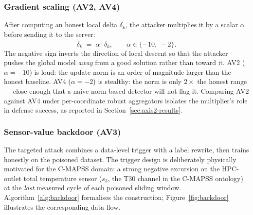 \documentclass[a4paper,fleqn,doubleblind]{cas-sc}
\begin{document}
\subsubsection{Gradient scaling (AV2, AV4)}
\label{subsec:gradscale}

After computing an honest local delta $\delta_k$, the attacker
multiplies it by a scalar $\alpha$ before sending it to the server:
\begin{equation}
    \tilde{\delta}_k \;=\; \alpha \cdot \delta_k,
    \qquad \alpha \in \{-10,\ -2\}.
    \label{eq:gradscale}
\end{equation}
The negative sign inverts the direction of local descent so that
the attacker pushes the global model \emph{away} from a good
solution rather than toward it. AV2 ($\alpha = -10$) is loud: the
update norm is an order of magnitude larger than the honest
baseline. AV4 ($\alpha = -2$) is stealthy: the norm is only
$2\times$ the honest range --- close enough that a naive norm-based
detector will not flag it. Comparing AV2 against AV4 under
per-coordinate robust aggregators isolates the multiplier's role in
defense success, as reported in Section~\ref{sec:axis2-results}.

\subsubsection{Sensor-value backdoor (AV3)}
\label{subsec:backdoor}

The targeted attack combines a data-level trigger with a label
rewrite, then trains honestly on the poisoned dataset. The trigger
design is deliberately physically motivated for the C-MAPSS domain:
a strong negative excursion on the HPC-outlet total temperature
sensor ($s_3$, the T30 channel in the C-MAPSS ontology) at the
\emph{last} measured cycle of each poisoned sliding window.
Algorithm~\ref{alg:backdoor} formalises the construction;
Figure~\ref{fig:backdoor} illustrates the corresponding data flow.
\end{document}
